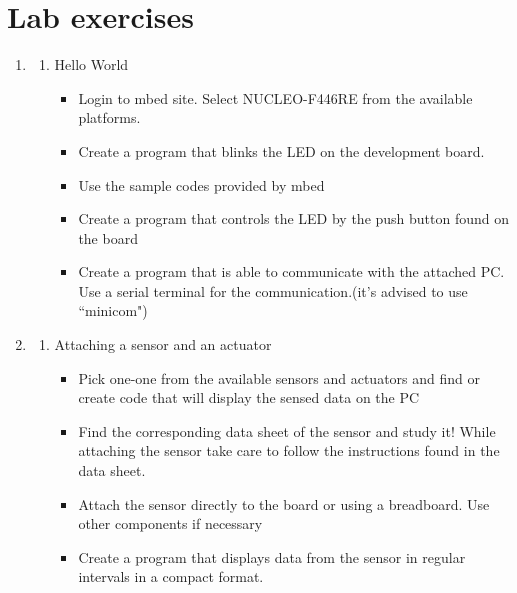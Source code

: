 \documentclass[a4paper]{article}
\begin{document}
\section{Lab exercises}

\begin{enumerate}
    \item \begin{enumerate}
              \item Hello World
                    \begin{itemize}
                        \item Login to mbed site. Select NUCLEO-F446RE from the available platforms.
                        \item Create a program that blinks the LED on the development board.
                        \item Use the sample codes provided by mbed
                        \item Create a program that controls the LED by the push button found on the board
                        \item Create a program that is able to communicate with the attached PC. Use a serial
                              terminal for the communication.(it's advised to use ``minicom")
                    \end{itemize}
          \end{enumerate}
    \item \begin{enumerate}
              \item Attaching a sensor and an actuator
                    \begin{itemize}
                        \item Pick one-one from the available sensors and actuators and find or create code
                              that will display the sensed data on the PC
                        \item Find the corresponding data sheet of the sensor and study it! While attaching
                              the sensor take care to follow the instructions found in the data sheet.
                        \item Attach the sensor directly to the board or using a breadboard. Use other components
                              if necessary
                        \item Create a program that displays data from the sensor in regular intervals in a compact format.
                    \end{itemize}

\end{enumerate}
\end{enumerate}
\end{document}
